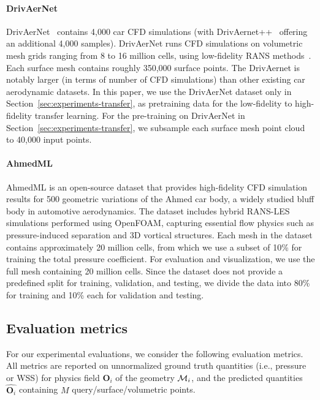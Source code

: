 \paragraph{DrivAerNet} DrivAerNet~\cite{elrefaie2024drivaernet, elrefaie2024drivaernet++} 
contains 4,000 car \ac{CFD} simulations (with DrivAernet++~\cite{elrefaie2024drivaernet++} offering an additional 4,000 samples).
DrivAerNet runs \ac{CFD} simulations on volumetric mesh grids ranging from 8 to 16 million cells, using low-fidelity \acl{RANS} methods~\cite{reynolds1895iv, alfonsi2009reynolds, ashton2015comparison}.
Each surface mesh contains roughly 350,000 surface points.
The DrivAernet is notably larger (in terms of number of CFD simulations) than other existing car aerodynamic datasets.
In this paper, we use the DrivAerNet dataset only in Section~\ref{sec:experiments-transfer}, as pretraining data for the low-fidelity to high-fidelity transfer learning. 
For the pre-training on DrivAerNet in Section~\ref{sec:experiments-transfer}, we subsample each surface mesh point cloud to 40,000 input points.

\paragraph{AhmedML} AhmedML \cite{ashton2024ahmed} is an open-source dataset that provides high-fidelity CFD simulation results for 500 geometric variations of the Ahmed car body, a widely studied bluff body in automotive aerodynamics. 
The dataset includes hybrid RANS-LES simulations performed using OpenFOAM, capturing essential flow physics such as pressure-induced separation and 3D vortical structures.
Each mesh in the dataset contains approximately 20 million cells, from which we use a subset of 10\% for training the total pressure coefficient. For evaluation and visualization, we use the full mesh containing 20 million cells.
Since the dataset does not provide a predefined split for training, validation, and testing, we divide the data into 80\% for training and 10\% each for validation and testing.


\subsection{Evaluation metrics}
\label{appendix:metrics}
For our experimental evaluations, we consider the following evaluation metrics.
All metrics are reported on unnormalized ground truth quantities (i.e., pressure or \acl{WSS}) for physics field $\bm{O}_{i}$ of the geometry $\mathcal{M}_{i}$, and the predicted quantities $\hat{\bm{O}_{i}}$ containing $M$ query/surface/volumetric points.

